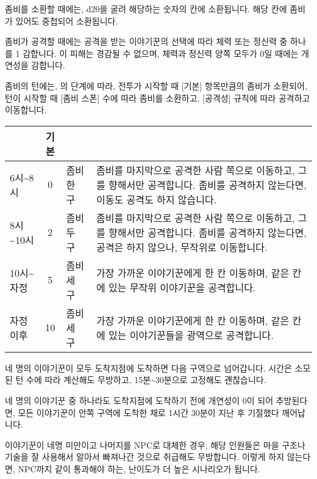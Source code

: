 \documentclass{report}
\begin{document}
		좀비를 소환할 때에는, d20을 굴려 해당하는 숫자의 칸에 소환됩니다. 해당 칸에 좀비가 있어도 중첩되어 소환됩니다.
		
		좀비가 공격할 때에는 공격을 받는 이야기꾼의 선택에 따라 체력 또는 정신력 중 하나를 1 감합니다. 이 피해는 경감될 수 없으며, 체력과 정신력 양쪽 모두가 0일 때에는 개연성을 감합니다.
		
		좀비의 턴에는, 의 단계에 따라, 전투가 시작할 때 [기본] 항목만큼의 좀비가 소환되어, 턴이 시작할 때 [좀비 스폰] 수에 따라 좀비를 소환하고, [공격성] 규칙에 따라 공격하고 이동합니다.
		
		\begin{tabularx}{\linewidth}{l|c|l|X}
			\makecell{\centering\textbf{시간}} & \textbf{기본} & \makecell{\centering\textbf{좀비 스폰}} & \makecell{\centering\textbf{공격성}}\\\hline\hline
			6시\textasciitilde8시 & 0 & 좀비 한 구 & 좀비를 마지막으로 공격한 사람 쪽으로 이동하고, 그를 향해서만 공격합니다. 좀비를 공격하지 않는다면, 이동도 공격도 하지 않습니다. \\\hline
			8시\textasciitilde10시 & 2 & 좀비 두 구 & 좀비를 마지막으로 공격한 사람 쪽으로 이동하고, 그를 향해서만 공격합니다. 좀비를 공격하지 않는다면, 공격은 하지 않으나, 무작위로 이동합니다. \\\hline
			10시\textasciitilde 자정 & 5 & 좀비 세 구 & 가장 가까운 이야기꾼에게 한 칸 이동하며, 같은 칸에 있는 무작위 이야기꾼을 공격합니다. \\\hline
			자정 이후 & 10 & 좀비 세 구 & 가장 가까운 이야기꾼에게 한 칸 이동하며, 같은 칸에 있는 이야기꾼들을 광역으로 공격합니다.
		\end{tabularx}
		
		네 명의 이야기꾼이 모두 도착지점에 도착하면 다음 구역으로 넘어갑니다. 시간은 소모된 턴 수에 따라 계산해도 무방하고, 15분\textasciitilde30분으로 고정해도 괜찮습니다.
		
		네 명의 이야기꾼 중 하나라도 도착지점에 도착하기 전에 개연성이 0이 되어 추방된다면, 모든 이야기꾼이 안쪽 구역에 도착한 채로 1시간 30분이 지난 후 기절했다 깨어납니다.
		
		이야기꾼이 네명 미만이고 나머지를 NPC로 대체한 경우, 해당 인원들은 마을 구조나 기술을 잘 사용해서 알아서 빠져나간 것으로 취급해도 무방합니다. 이렇게 하지 않는다면, NPC까지 같이 통과해야 하는, 난이도가 더 높은 시나리오가 됩니다.
	
\end{document}
